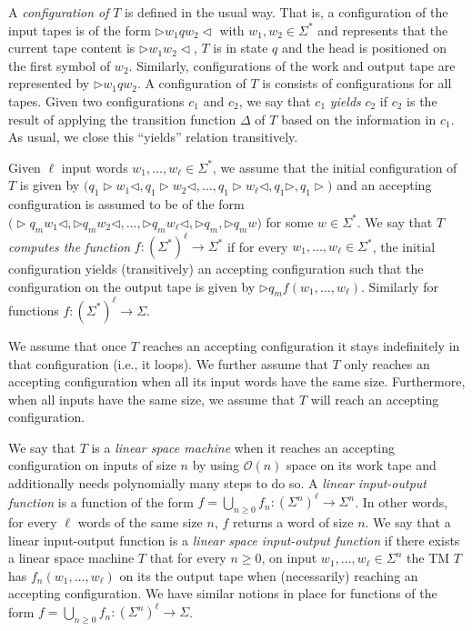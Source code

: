 A \textit{configuration of} $T$ is defined in the usual way. That is, a configuration of the input tapes is of the form
$\rhd w_1qw_2\lhd$ with $w_1,w_2\in\Sigma^*$ and represents that the current tape content is 
$\rhd w_1w_2\lhd$, $T$ is in state $q$ and the head is positioned on the first symbol of $w_2$. 
Similarly, configurations of the work and output tape are represented by $\rhd w_1qw_2$. 
A configuration of $T$ is consists of configurations for all tapes. Given two configurations 
$c_1$ and $c_2$, we say that $c_1$ \textit{yields} $c_2$ if $c_2$ is the result of applying the transition 
function $\Delta$ of $T$ based on the information in $c_1$. As usual, we close this ``yields'' relation 
transitively.

Given $\ell$ input words $w_1,\ldots,w_\ell\in\Sigma^*$, we assume that the initial configuration of 
$T$ is given by
$\bigl(q_1\rhd  w_1\lhd,q_1\rhd w_2\lhd,\ldots, q_1\rhd w_\ell\lhd,q_1\rhd, q_1\rhd \bigr)$ and an 
accepting configuration is assumed to be of the form 
$\bigl(\rhd q_m w_1\lhd,\rhd q_m w_2\lhd,\ldots, \rhd q_m w_\ell\lhd,\rhd q_m,\rhd q_m w\bigr)$ for some
$w\in\Sigma^*$. We say that $T$ \textit{computes the function} $f:(\Sigma^*)^{\ell}\to\Sigma^*$ if for every
$w_1,\ldots,w_\ell\in\Sigma^*$, the initial configuration yields (transitively) an accepting 
configuration such that the configuration on the output tape is
given by $\rhd q_m f(w_1,\ldots,w_\ell)$. Similarly for functions $f:(\Sigma^*)^\ell\to\Sigma$.

We assume that once $T$ reaches an accepting configuration it stays indefinitely in that configuration 
(i.e., it loops). We further assume that $T$ only reaches an accepting configuration when all its input
words have the same size. Furthermore, when all inputs have the same size, we assume that $T$ will reach an accepting 
configuration. 


We say that $T$ is a \textit{linear space machine} when it reaches an accepting configuration 
on inputs of size $n$ by using $\mathcal{O}(n)$ space on its work tape and additionally needs 
polynomially many steps to do so. A \textit{linear input-output function} is a function of the form 
$f=\bigcup_{n\geq 0} f_n:(\Sigma^n)^\ell\to\Sigma^n$. In other words, for every $\ell$ words of the same 
size $n$, $f$ returns a word of size $n$. We say that a linear input-output function is a 
\textit{linear space input-output function} if
there exists a linear space machine  $T$ that for every $n\geq 0$, on input $w_1,\ldots,w_\ell\in\Sigma^n$ 
the TM $T$ has
$f_n(w_1,\ldots,w_\ell)$ on its the output tape when (necessarily) reaching an accepting configuration.
We have similar notions in place for functions of the form $f=\bigcup_{n\geq 0} f_n:(\Sigma^n)^\ell\to\Sigma$.

